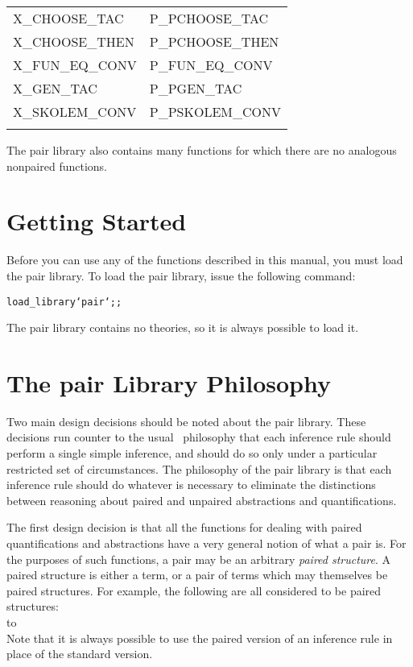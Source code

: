 {\begin{center}
\begin{tabular}[t]{|l|l|}
        X\_CHOOSE\_TAC              &   P\_PCHOOSE\_TAC             \\
        X\_CHOOSE\_THEN             &   P\_PCHOOSE\_THEN            \\
        X\_FUN\_EQ\_CONV            &   P\_FUN\_EQ\_CONV            \\
        X\_GEN\_TAC                 &   P\_PGEN\_TAC                \\
        X\_SKOLEM\_CONV             &   P\_PSKOLEM\_CONV            \\
                                    &                               \\  \hline
    \end{tabular}
\end{center} }
The pair library also contains many functions for which there are no
analogous nonpaired functions.

\section{Getting Started}

Before you can use any of the functions described in this manual,
you must load the pair library.
To load the pair library, issue the following command:
\begin{hol}\begin{alltt}
    load_library `pair`;;
\end{alltt}\end{hol}
The pair library contains no theories, so it is always possible to load it.

\section{The pair Library Philosophy}

Two main design decisions should be noted about the pair library.
These decisions run counter to the usual \HOL\ philosophy that each
inference rule should perform a single simple inference,
and should do so only under a particular restricted set of circumstances.
The philosophy of the pair library is that each
inference rule should do whatever is necessary to eliminate the distinctions
between reasoning about paired and unpaired abstractions and quantifications.

The first design decision is that all the functions for dealing with paired
quantifications and abstractions have a very general notion of what a pair is.
For the purposes of such functions, a pair may be an arbitrary
{\it paired structure}.
A paired structure is either a term,
or a pair of terms which may themselves be paired structures.
For example, the following are all considered to be paired structures:  \\
\noindent
\hbox to \textwidth{\tt
    \hfil
    a
    \hfil
    (a,b)
    \hfil
    (a,b,c)
    \hfil
    ((a1,a2),(b1,b2))
    \hfil
    ((a1,a2),(b2,b2),(c1,c2))
    \hfil
}\\
\noindent
Note that it is always possible to use the paired version
of an inference rule in place of the standard version.

